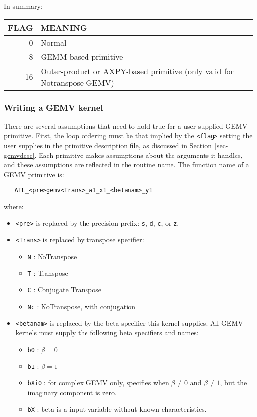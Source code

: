 \documentclass[11pt]{article}
\begin{document}
In summary:
\begin{table}[h]
\begin{tabular}{||r|l||}\hline\hline
FLAG & MEANING \\\hline\hline
   0 & Normal \\\hline
   8 & GEMM-based primitive \\\hline
  16 & Outer-product or AXPY-based primitive (only valid for Notranspose GEMV) \\\hline \hline
\end{tabular}
\end{table}

\subsubsection{Writing a GEMV kernel}

There are several assumptions that need to hold true for a user-supplied GEMV
primitive.  First, the loop ordering must be that implied by the 
\verb+<flag>+ setting
the user supplies in the primitive description file, as discussed in
Section~\ref{sec-gemvdesc}.  
Each primitive makes assumptions about the arguments it handles,
and these assumptions are reflected in the routine name.  The function name of
a GEMV primitive is:
\begin{verbatim}
   ATL_<pre>gemv<Trans>_a1_x1_<betanam>_y1
\end{verbatim}
where:
\begin{itemize}
\item \verb+<pre>+ is replaced by the precision prefix:  
      {\tt s}, {\tt d}, {\tt c}, or {\tt z}.
\item \verb+<Trans>+ is replaced by transpose specifier:
  \begin{itemize}
   \item {\tt N} : NoTranspose
   \item {\tt T} : Transpose
   \item {\tt C} : Conjugate Transpose
   \item {\tt Nc} : NoTranspose, with conjugation
  \end{itemize}
\item \verb+<betanam>+ is replaced by the beta specifier this kernel
supplies.  All GEMV kernels must supply the following beta specifiers and
names:
  \begin{itemize}
     \item {\tt b0} : $\beta = 0$
     \item {\tt b1} : $\beta = 1$
     \item {\tt bXi0} : for complex GEMV only, specifies when 
$\beta \neq 0$ and $\beta \neq 1$, but the imaginary component is zero.
     \item {\tt bX} : beta is a input variable without known characteristics.
  \end{itemize}
\end{itemize}
\end{document}
